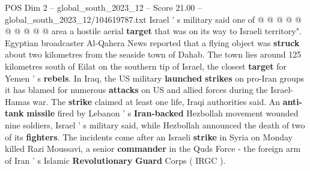 \begin{textsample}{POS Dim 2 – global\_south\_2023\_12 – Score 21.00 – global\_south\_2023\_12/104619787.txt}
Israel ' s military said one of @ @ @ @ @ @ @ @ @ @ area a hostile aerial \textbf{target} that was on its way to Israeli territory".
Egyptian broadcaster Al-Qahera News reported that a flying object was \textbf{struck} about two kilometres from the seaside town of Dahab.
The town lies around 125 kilometres south of Eilat on the southern tip of Israel, the closest \textbf{target} for Yemen ' s \textbf{rebels}.
In Iraq, the US military \textbf{launched} \textbf{strikes} on pro-Iran groups it has blamed for numerous \textbf{attacks} on US and allied forces during the Israel-Hamas war.
The \textbf{strike} claimed at least one life, Iraqi authorities said.
An \textbf{anti-tank} \textbf{missile} fired by Lebanon ' s \textbf{Iran-backed} Hezbollah movement wounded nine soldiers, Israel ' s military said, while Hezbollah announced the death of two of its \textbf{fighters}.
The incidents come after an Israeli \textbf{strike} in Syria on Monday killed Razi Moussavi, a senior \textbf{commander} in the Quds Force - the foreign arm of Iran ' s Islamic \textbf{Revolutionary} \textbf{Guard} Corps ( IRGC ).

\end{textsample}
